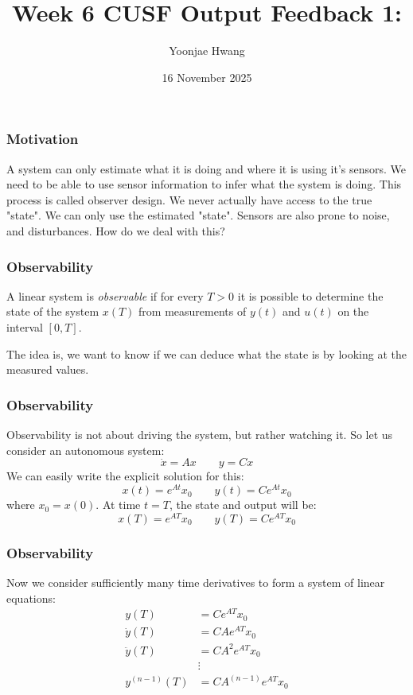 \documentclass{beamer}
\title{Week 6 CUSF Output Feedback 1: }
\author{Yoonjae Hwang}
\date{16 November 2025}
\theoremstyle{definition}
\theoremstyle{remark}
\begin{document}
\frame{\titlepage}

\begin{frame}
\frametitle{Motivation}
A system can only estimate what it is doing and where it is using it's sensors.
We need to be able to use sensor information to infer what the system is doing. 
This process is called observer design. 
We never actually have access to the true "state". We can only use the estimated "state". 
\newline
Sensors are also prone to noise, and disturbances. How do we deal with this?  
\end{frame}

\begin{frame}
\frametitle{Observability}
\begin{definition}[Observability]
A linear system is \textsl{observable} if for every $T > 0$ it is 
possible to determine the state of the system $x(T)$ from measurements 
of $y(t)$ and $u(t)$ on the interval $[0, T]$.
\end{definition}
The idea is, we want to know if we can deduce what the state is by looking at the measured values. 
\end{frame}

\begin{frame}
\frametitle{Observability}
Observability is not about driving the system, but rather watching it. 
So let us consider an autonomous system: 
\begin{equation}
    \dot{x} = A x \qquad y =  C x
\end{equation}
We can easily write the explicit solution for this: 
\begin{equation}
    x(t) = e^{At} x_0 \qquad y(t) = Ce^{At}x_0
\end{equation}
where $x_0 = x(0)$.
At time $t=T$, the state and output will be: 
\begin{equation}
    x(T) = e^{AT} x_0 \qquad y(T) = Ce^{AT}x_0
\end{equation}
\end{frame}

\begin{frame}
\frametitle{Observability}
Now we consider sufficiently many time derivatives to form a system of linear equations:
\begin{equation}
\begin{aligned}
y(T) &= Ce^{AT}x_0 \\ 
\dot{y}(T) &= CAe^{AT}x_0 \\
\ddot{y}(T) &= CA^2 e^{AT}x_0 \\
&\vdots \\
y^{(n-1)} (T) &= CA^{(n-1)} e^{AT} x_0 
\end{aligned}
\end{equation}
\end{frame}
\end{document}
